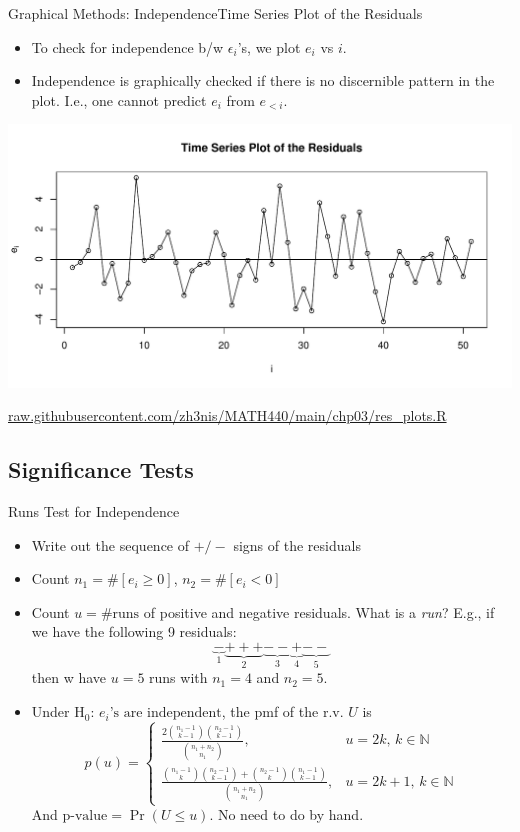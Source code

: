 \documentclass{beamer}
\begin{document}
\begin{frame}{Graphical Methods: Independence}{Time Series Plot of the Residuals}
\begin{itemize}
    \item To check for independence b/w $\epsilon_i$'s, we plot $e_i$ vs $i$.
    \item\pause Independence is graphically checked if there is no discernible pattern in the
plot. \pause I.e., one cannot predict $e_i$ from $e_{<i}$.
\end{itemize}
\pause\begin{center}
    \includegraphics[width=.9\textwidth]{plots/res_ts.pdf}
\end{center}
\vspace{-10pt}
\footnotesize{\color{blue}\url{raw.githubusercontent.com/zh3nis/MATH440/main/chp03/res_plots.R}}
\end{frame}

\subsection{Significance Tests}
\begin{frame}{Runs Test for Independence}
\begin{itemize}
    \item Write out the sequence of $+/-$ signs of the residuals
    \item\pause Count $n_1=\#[e_i\ge0]$, $n_2=\#[e_i<0]$
    \item\pause Count $u=\#\text{runs}$ of positive and negative residuals. \pause What is a \textit{run}? \pause E.g., if we have the following 9 residuals:
    $$
    \underbrace{-}_{1}\underbrace{+++}_{2}\underbrace{--}_{3}\underbrace{+}_{4}\underbrace{--}_{5}
    $$
    then w have $u=5$ runs with $n_1=4$ and $n_2=5$.
    \item\pause Under $\mathrm{H}_0:\,e_i\text{'s are independent}$, the pmf of the r.v. $U$ is
    $$
    p(u)=\begin{cases}
    \frac{2{{n_1-1}\choose{k-1}}{{n_2-1}\choose{k-1}}}{{n_1+n_2\choose n_1}}, &u=2k,\,k\in\mathbb{N}\\
    \frac{{n_1-1\choose k}{n_2-1\choose k-1}+{n_2-1\choose k}{n_1-1\choose k-1}}{{n_1+n_2\choose n_1}},&u=2k+1,\,k\in\mathbb{N}
    \end{cases}
    $$
    \pause And $\text{p-value}=\Pr(U\le u)$. No need to do by hand.
\end{itemize}
\end{frame}
\end{document}
